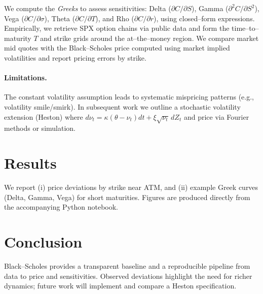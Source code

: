 \documentclass[12pt]{article}
\begin{document}
We compute the \emph{Greeks} to assess sensitivities: Delta ($\partial C/\partial S$), Gamma ($\partial^2 C/\partial S^2$),
Vega ($\partial C/\partial \sigma$), Theta ($\partial C/\partial T$), and Rho ($\partial C/\partial r$), using closed--form expressions.
Empirically, we retrieve SPX option chains via public data and form the time--to--maturity $T$ and strike grids around the at--the--money region.
We compare market mid quotes with the Black--Scholes price computed using market implied volatilities and report pricing errors by strike.

\paragraph{Limitations.} The constant volatility assumption leads to systematic mispricing patterns (e.g., volatility smile/smirk).
In subsequent work we outline a stochastic volatility extension (Heston) where $d\nu_t = \kappa(\theta-\nu_t)dt + \xi \sqrt{\nu_t}\, dZ_t$
and price via Fourier methods or simulation.

\section{Results}
We report (i) price deviations by strike near ATM, and (ii) example Greek curves (Delta, Gamma, Vega) for short maturities.
Figures are produced directly from the accompanying Python notebook.

\section{Conclusion}
Black--Scholes provides a transparent baseline and a reproducible pipeline from data to price and sensitivities.
Observed deviations highlight the need for richer dynamics; future work will implement and compare a Heston specification.



\end{document}
